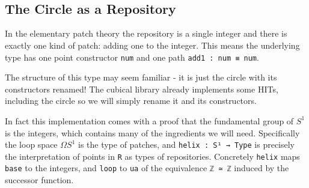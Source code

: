 \begin{code}[hide]
%
\>[2]\AgdaSymbol{;}\AgdaSpace{}%
\<%
\\
%
\>[2]\AgdaSymbol{;}\AgdaSpace{}%
\<%
\\
%
\>[2]\AgdaSymbol{;}\AgdaSpace{}%
\<%
\\
%
\>[2]\AgdaSymbol{;}\AgdaSpace{}%
\<%
\\
%
\>[2]\AgdaSymbol{)}\<%
\\
%
\\[\AgdaEmptyExtraSkip]%
\>[0]\AgdaSpace{}%
\AgdaSpace{}%
\<%
\\
\>[0][@{}l@{\AgdaIndent{0}}]%
\>[2]\AgdaSpace{}%
\AgdaSymbol{(}\AgdaSymbol{)}\<%
\end{code}

\subsection{The Circle as a Repository}

In the elementary patch theory the repository is a single integer and there is exactly
one kind of patch: adding one to the integer.
This means the underlying type has one point constructor \texttt{num} and
one path \texttt{add1 : num ≡ num}.

The structure of this type may seem familiar - it is just the circle with its constructors renamed!
The cubical library already implements some HITs, including the circle so we will simply rename it and
its constructors.

In fact this implementation comes with a proof that the fundamental group of $S^1$ is the integers,
which contains many of the ingredients we will need. Specifically the loop space $ΩS^1$ is the type
of patches, and \texttt{helix : S¹ → Type} is precisely the interpretation of points in \texttt{R} as
types of repositories. Concretely \texttt{helix} maps \texttt{base} to the integers, and \texttt{loop}
to \texttt{ua} of the equivalence \texttt{ℤ ≃ ℤ} induced by the successor function.


